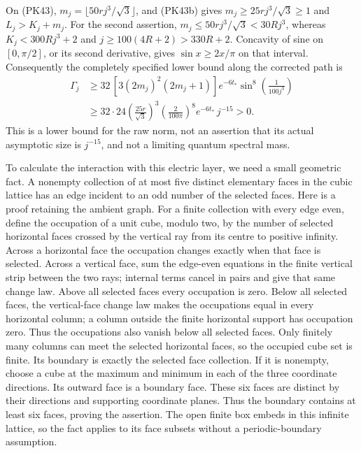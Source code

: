 \documentclass[11pt]{article}
\begin{document}
On (PK43), \(m_j=\lfloor50rj^3/\sqrt3\rfloor\), and (PK43b) gives
\(m_j\ge25rj^3/\sqrt3\ge1\) and \(L_j>K_j+m_j\).
For the second assertion, \(m_j\le50rj^3/\sqrt3<30Rj^3\), whereas
\(K_j<300Rj^3+2\) and \(j\ge100(4R+2)>330R+2\).
Concavity of sine on \([0,\pi/2]\), or its second derivative, gives
\(\sin x\ge2x/\pi\) on that interval. Consequently the completely
specified lower bound along the corrected path is
\[
 \begin{aligned}
 \Gamma_j
 &\ge32\,[3(2m_j)^2(2m_j+1)]e^{-6t_*}
                  \sin^8\!\left(\frac1{100j^3}\right)\\
 &\ge32\cdot24
    \left(\frac{25r}{\sqrt3}\right)^3
    \left(\frac2{100\pi}\right)^8e^{-6t_*}\,j^{-15}>0.
 \end{aligned}\tag{PK49}
\]
This is a lower bound for the raw norm, not an assertion that its actual
asymptotic size is \(j^{-15}\), and not a limiting quantum spectral mass.

To calculate the interaction with this electric layer, we need a small
geometric fact. A nonempty collection of at most five distinct elementary
faces in the cubic lattice has an edge incident to an odd number of the
selected faces. Here is a proof retaining the ambient graph. For a finite
collection with every edge even, define the occupation of a unit cube,
modulo two, by the number of selected horizontal faces crossed by the
vertical ray from its centre to positive infinity. Across a horizontal
face the occupation changes exactly when that face is selected. Across
a vertical face, sum the edge-even equations in the finite vertical strip
between the two rays; internal terms cancel in pairs and give that same
change law. Above all selected faces every occupation is zero. Below
all selected faces, the vertical-face change law makes the occupations
equal in every horizontal column; a column outside the finite horizontal
support has occupation zero. Thus the occupations also vanish below all
selected faces. Only finitely many columns can meet the selected horizontal
faces, so the occupied cube set is finite. Its boundary is exactly the
selected face collection. If it is nonempty,
choose a cube at the maximum and minimum in each of the three coordinate
directions. Its outward face is a boundary face. These six faces are
distinct by their directions and supporting coordinate planes. Thus the
boundary contains at least six faces, proving the assertion. The open
finite box embeds in this infinite lattice, so the fact applies to its
face subsets without a periodic-boundary assumption.
\end{document}
